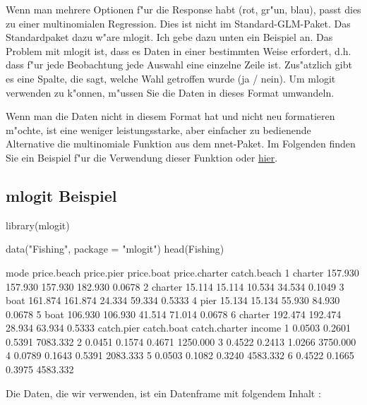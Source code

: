 \documentclass[a4paper,twoside]{tufte-book}\usepackage[]{graphicx}\usepackage[]{color}
\begin{document}
\begin{appendices}
Wenn man mehrere Optionen f"ur die Response habt (rot, gr"un, blau), passt dies zu einer multinomialen Regression. Dies ist nicht im Standard-GLM-Paket. Das Standardpaket dazu w"are mlogit. Ich gebe dazu unten ein Beispiel an. Das Problem mit mlogit ist, dass es Daten in einer bestimmten Weise erfordert, d.h. dass f"ur jede Beobachtung jede Auswahl eine einzelne Zeile ist. Zus"atzlich gibt es eine Spalte, die sagt, welche Wahl getroffen wurde (ja / nein). Um mlogit verwenden zu k"onnen, m"ussen Sie die Daten in dieses Format umwandeln.

Wenn man die Daten nicht in diesem Format hat und nicht neu formatieren m"ochte, ist eine weniger leistungsstarke, aber einfacher zu bedienende Alternative die multinomiale Funktion aus dem nnet-Paket. Im Folgenden finden Sie ein Beispiel f"ur die Verwendung dieser Funktion oder \href{http://www.ats.ucla.edu/stat/stata/dae/mlogit.htm}{hier}.

\subsection{mlogit Beispiel}



\begin{Schunk}
\begin{Sinput}
library(mlogit)
 
data("Fishing", package = "mlogit")
head(Fishing)
\end{Sinput}
\begin{Soutput}
     mode price.beach price.pier price.boat price.charter catch.beach
1 charter     157.930    157.930    157.930       182.930      0.0678
2 charter      15.114     15.114     10.534        34.534      0.1049
3    boat     161.874    161.874     24.334        59.334      0.5333
4    pier      15.134     15.134     55.930        84.930      0.0678
5    boat     106.930    106.930     41.514        71.014      0.0678
6 charter     192.474    192.474     28.934        63.934      0.5333
  catch.pier catch.boat catch.charter   income
1     0.0503     0.2601        0.5391 7083.332
2     0.0451     0.1574        0.4671 1250.000
3     0.4522     0.2413        1.0266 3750.000
4     0.0789     0.1643        0.5391 2083.333
5     0.0503     0.1082        0.3240 4583.332
6     0.4522     0.1665        0.3975 4583.332
\end{Soutput}
\end{Schunk}

Die Daten, die wir verwenden, ist ein Datenframe mit folgendem Inhalt :


\end{appendices}
\end{document}
